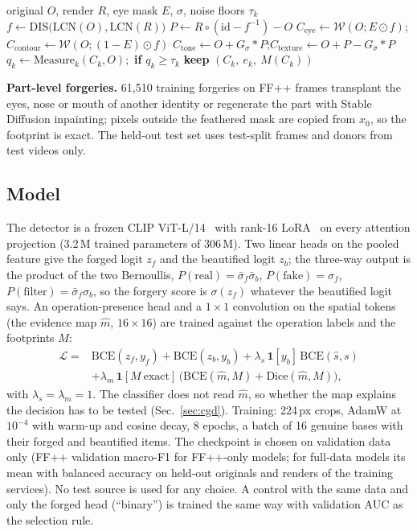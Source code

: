 \documentclass[conference]{IEEEtran}
\begin{document}
\begin{algorithm}[t]
\caption{Single-operation components of a commercial render}
\label{alg:decomp}
\begin{algorithmic}[1]
\Require original $O$, render $R$, eye mask $E$, $\sigma$, noise floors $\tau_k$
\State $f\gets\mathrm{DIS}\big(\mathrm{LCN}(O),\mathrm{LCN}(R)\big)$
\State $P\gets R\circ(\mathrm{id}-f^{-1}) - O$
\State $C_\text{eye}\gets\mathcal{W}(O;E\odot f)$;\quad $C_\text{contour}\gets\mathcal{W}(O;(1-E)\odot f)$
\State $C_\text{tone}\gets O+G_\sigma*P$;\quad $C_\text{texture}\gets O+P-G_\sigma*P$
  \State $q_k\gets\mathrm{Measure}_k(C_k,O)$;\ \textbf{if} $q_k\ge\tau_k$ \textbf{keep} $(C_k,\ e_k,\ M(C_k))$
\EndFor
\end{algorithmic}
\end{algorithm}

\textbf{Part-level forgeries.} 61,510 training forgeries on FF++ frames transplant the eyes, nose or mouth of another
identity or regenerate the part with Stable Diffusion inpainting; pixels outside the feathered mask are copied from
$x_0$, so the footprint is exact. The held-out test set uses test-split frames and donors from test videos only.

\subsection{Model}
\label{sec:model}
The detector is a frozen CLIP ViT-L/14~\cite{clip} with rank-16 LoRA~\cite{lora} on every attention projection (3.2\,M
trained parameters of 306\,M). Two linear heads on the pooled feature give the forged logit $z_f$ and the beautified logit
$z_b$; the three-way output is the product of the two Bernoullis, $P(\text{real})=\bar\sigma_f\bar\sigma_b$,
$P(\text{fake})=\sigma_f$, $P(\text{filter})=\bar\sigma_f\sigma_b$, so the forgery score is $\sigma(z_f)$ whatever the
beautified logit says. An operation-presence head and a $1\times1$ convolution on the spatial tokens (the evidence map
$\hat m$, $16\times16$) are trained against the operation labels and the footprints $M$:
\begin{align}
\mathcal{L}={}&\mathrm{BCE}(z_f,y_f)+\mathrm{BCE}(z_b,y_b)+\lambda_s\,\mathbf{1}[y_b]\,\mathrm{BCE}(\hat s,s) \nonumber\\
&+\lambda_m\,\mathbf{1}[M\ \text{exact}]\,\big(\mathrm{BCE}(\hat m,M)+\mathrm{Dice}(\hat m,M)\big),
\label{eq:loss}
\end{align}
with $\lambda_s=\lambda_m=1$. The classifier does not read $\hat m$, so whether the map explains the decision has to be
tested (Sec.~\ref{sec:cgd}). Training: 224\,px crops, AdamW at $10^{-4}$ with warm-up and cosine decay, 8 epochs, a batch
of 16 genuine bases with their forged and beautified items. The checkpoint is chosen on validation data only (FF++
validation macro-F1 for FF++-only models; for full-data models its mean with balanced accuracy on held-out originals and
renders of the training services). No test source is used for any choice. A control with the same data and only the
forged head (``binary'') is trained the same way with validation AUC as the selection rule.
\end{document}
